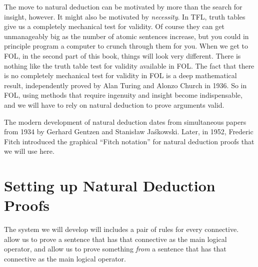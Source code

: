 The move to natural deduction can be motivated by more than the search for insight, however. It might also be motivated by \emph{necessity}. In TFL, truth tables give us a  completely mechanical test for validity.  Of course they can get unmanageably big as the number of atomic sentences increase, but you could in principle program a computer to crunch through them for you.   When we get to FOL, in the second part of this book, things will look very different. There is nothing like the truth table test for validity available in FOL.  The fact that there is no completely mechanical test for validity in FOL is a deep mathematical result, independently proved by Alan Turing and Alonzo Church in 1936.  So in FOL, using methods that require ingenuity and insight become indispensable, and we will have to rely on natural deduction to prove arguments valid. 

The modern development of natural deduction dates from simultaneous papers from 1934 by Gerhard Gentzen and Stanis\l{}aw Ja\'{s}kowski.   Later, in 1952, Frederic Fitch introduced the graphical ``Fitch notation'' for natural deduction proofs that we will use here.  



\section{Setting up Natural Deduction Proofs}\label{s:BasicTFL}

The  system we will develop will includes a pair of rules for every connective.   allow us to prove a sentence that has that connective as the main logical operator, and  allow us to prove something \emph{from} a sentence that has that connective as the main logical operator.  %

